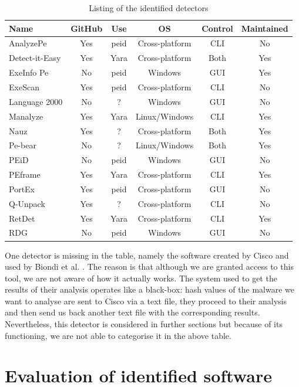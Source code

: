 \begin{table}[H]
\centering
\begin{tabular}{|l|c|c|c|c|c|}
    \hline
    \textbf{Name} & \textbf{GitHub} & \textbf{Use} & \textbf{OS} & \textbf{Control} & \textbf{Maintained}  \\
    \hline \hline
    AnalyzePe & Yes & peid & Cross-platform & CLI & No \\
    Detect-it-Easy & Yes & Yara & Cross-platform & Both & Yes \\
    ExeInfo Pe & No & peid & Windows & GUI & Yes \\
    ExeScan & Yes & peid & Cross-platform & CLI & No \\
    Language 2000 & No & ? & Windows & GUI & No \\
    Manalyze & Yes & Yara & Linux/Windows & CLI & Yes \\
    Nauz & Yes & ? & Cross-platform & Both & Yes \\ 
    Pe-bear & No & ? & Linux/Windows & Both & Yes \\
    PEiD & No & peid & Windows & GUI & No \\
    PEframe & Yes & Yara & Cross-platform & CLI & Yes \\ 
    PortEx & Yes & peid & Cross-platform & GUI & No \\
    Q-Unpack & Yes & ? & Cross-platform & CLI & No \\
    RetDet & Yes & Yara & Cross-platform & CLI & Yes \\
    RDG & No & peid & Windows & GUI & No \\
    \hline
\end{tabular}
\caption{Listing of the identified detectors}
\label{Tab:list_detectors}
\end{table}

One detector is missing in the table, namely the software created by Cisco and used by Biondi et al. \cite{biondi_effective_2019}. The reason is that although we are granted access to this tool, we are not aware of how it actually works. The system used to get the results of their analysis operates like a black-box: hash values of the malware we want to analyse are sent to Cisco via a text file, they proceed to their analysis and then send us back another text file with the corresponding results. Nevertheless, this detector is considered in further sections but because of its functioning, we are not able to categorise it in the above table.

\section{Evaluation of identified software}

